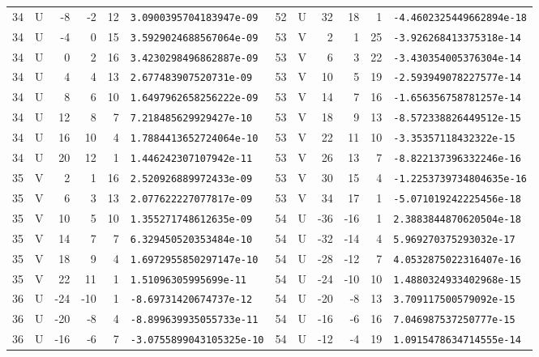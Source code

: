 \begin{longtable}{rcrrrl|rcrrrl}
34 & U & -8 & -2 & 12 & \texttt{3.0900395704183947e-09} & 52 & U & 32 & 18 & 1 & \texttt{-4.4602325449662894e-18}\\
34 & U & -4 & 0 & 15 & \texttt{3.5929024688567064e-09} & 53 & V & 2 & 1 & 25 & \texttt{-3.926268413375318e-14}\\
34 & U & 0 & 2 & 16 & \texttt{3.4230298496862887e-09} & 53 & V & 6 & 3 & 22 & \texttt{-3.430354005376304e-14}\\
34 & U & 4 & 4 & 13 & \texttt{2.677483907520731e-09} & 53 & V & 10 & 5 & 19 & \texttt{-2.593949078227577e-14}\\
34 & U & 8 & 6 & 10 & \texttt{1.6497962658256222e-09} & 53 & V & 14 & 7 & 16 & \texttt{-1.656356758781257e-14}\\
34 & U & 12 & 8 & 7 & \texttt{7.218485629929427e-10} & 53 & V & 18 & 9 & 13 & \texttt{-8.572338826449512e-15}\\
34 & U & 16 & 10 & 4 & \texttt{1.7884413652724064e-10} & 53 & V & 22 & 11 & 10 & \texttt{-3.35357118432322e-15}\\
34 & U & 20 & 12 & 1 & \texttt{1.446242307107942e-11} & 53 & V & 26 & 13 & 7 & \texttt{-8.822137396332246e-16}\\
35 & V & 2 & 1 & 16 & \texttt{2.520926889972433e-09} & 53 & V & 30 & 15 & 4 & \texttt{-1.2253739734804635e-16}\\
35 & V & 6 & 3 & 13 & \texttt{2.077622227077817e-09} & 53 & V & 34 & 17 & 1 & \texttt{-5.071019242225456e-18}\\
35 & V & 10 & 5 & 10 & \texttt{1.355271748612635e-09} & 54 & U & -36 & -16 & 1 & \texttt{2.3883844870620504e-18}\\
35 & V & 14 & 7 & 7 & \texttt{6.329450520353484e-10} & 54 & U & -32 & -14 & 4 & \texttt{5.969270375293032e-17}\\
35 & V & 18 & 9 & 4 & \texttt{1.6972955850297147e-10} & 54 & U & -28 & -12 & 7 & \texttt{4.0532875022316407e-16}\\
35 & V & 22 & 11 & 1 & \texttt{1.51096305995699e-11} & 54 & U & -24 & -10 & 10 & \texttt{1.4880324933402968e-15}\\
36 & U & -24 & -10 & 1 & \texttt{-8.69731420674737e-12} & 54 & U & -20 & -8 & 13 & \texttt{3.709117500579092e-15}\\
36 & U & -20 & -8 & 4 & \texttt{-8.899639935055733e-11} & 54 & U & -16 & -6 & 16 & \texttt{7.046987537250777e-15}\\
36 & U & -16 & -6 & 7 & \texttt{-3.0755899043105325e-10} & 54 & U & -12 & -4 & 19 & \texttt{1.0915478634714555e-14}\\

\end{longtable}
